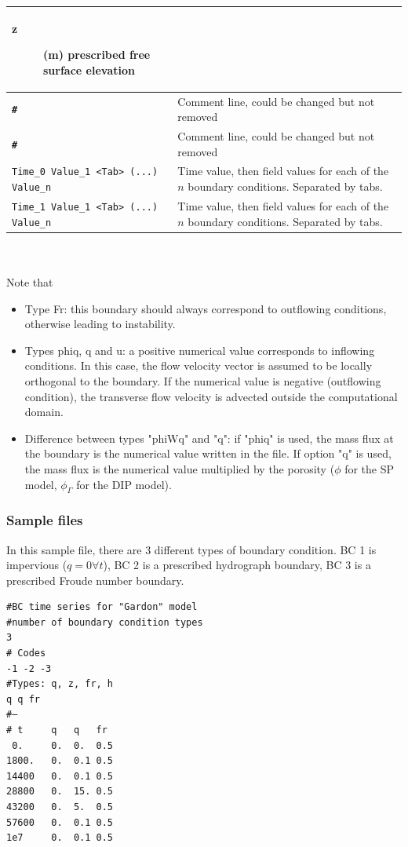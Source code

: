 \begin{tabular}{p{6cm} | p{9cm}}
\begin{description}
    \item [z] (m) prescribed free surface elevation
    \end{description} \\ \hline
    \texttt{\textbf{\#   } } & Comment line, could be changed but not removed \\ \hline
    \texttt{\textbf{\#}} & Comment line, could be changed but not removed \\  \hline
    \texttt{Time\_0 Value\_1 <Tab> (...) Value\_n} & Time value, then field values for each of the $n$ boundary conditions. Separated by tabs. \\ \hline
    \texttt{Time\_1 Value\_1 <Tab> (...) Value\_n} & Time value, then field values for each of the $n$ boundary conditions. Separated by tabs. \\ \hline
    \end{tabular}
%   
\\
~\\ 
Note that
\begin{itemize}
\item Type Fr: this boundary should always correspond to outflowing conditions, otherwise leading to instability.
\item Types phiq, q and u: a positive numerical value corresponds to inflowing conditions. In this case, the flow velocity vector is assumed to be locally orthogonal to the boundary. If the numerical value is negative (outflowing condition), the transverse flow velocity is advected outside the computational domain.
\item Difference between types "phiWq" and "q": if "phiq" is used, the mass flux at the boundary is the numerical value written in the file. If option "q" is used, the mass flux is the numerical value multiplied by the porosity ($\phi$ for the SP model, $\phi_\Gamma$ for the DIP model).%
\end{itemize}   
    
%    
\subsubsection{Sample files}
In this sample file, there are 3 different types of boundary condition. BC 1 is impervious ($q = 0 \forall t$), BC 2 is a prescribed hydrograph boundary, BC 3 is a prescribed Froude number boundary.

\begin{verbatim}
#BC time series for "Gardon" model
#number of boundary condition types
3
# Codes
-1 -2 -3
#Types: q, z, fr, h
q q fr
#—
# t   	q	q	fr	
 0.		0.	0.	0.5
1800.	0.	0.1	0.5
14400	0.	0.1	0.5	
28800	0.	15.	0.5
43200	0.	5.	0.5
57600	0.	0.1	0.5
1e7		0.	0.1	0.5
\end{verbatim}
